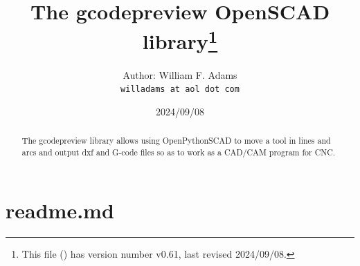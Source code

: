 \documentclass{ltxdoc}
\begin{document}

\def\fileversion{v0.61} \def\filedate{2024/09/08}






\title{The gcodepreview OpenSCAD library\thanks{This
        file (\texttt{\jobname}) has version number \fileversion, last revised
        \filedate.}}

\author{%
Author: William F. Adams\\
\texttt{willadams at aol dot com}
}
\date{\filedate}
\maketitle
\begin{abstract}
\noindent The gcodepreview library allows using OpenPythonSCAD to move a tool in lines 
and arcs and output dxf and G-code files so as to work as a CAD/\allowbreak CAM program 
for CNC.
\end{abstract}
\tableofcontents

\clearpage
\section{readme.md}
\end{document}
